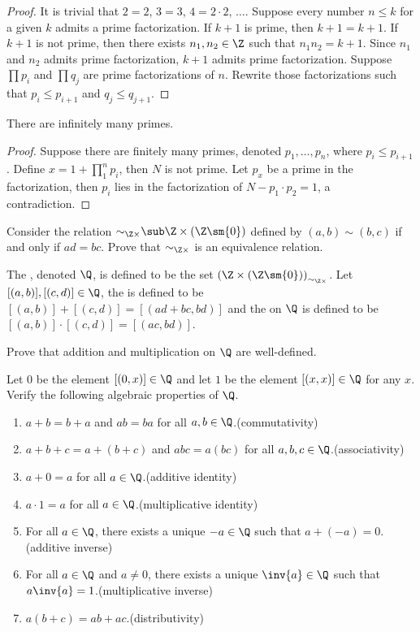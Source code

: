 \documentclass[10pt]{article}
\begin{document}
\begin{proof}
    It is trivial that $2=2$, $3=3$, $4=2\cdot 2$, $\dots$. Suppose every number $n\le k$ for a given $k$ admits a prime factorization. If $k+1$ is prime, then $k+1=k+1$. If $k+1$ is not prime, then there exists ${n}_{1},{n}_{2}\in\Z$ such that ${n}_{1}{n}_{2}=k+1$. Since ${n}_{1}$ and ${n}_{2}$ admits prime factorization, $k+1$ admits prime factorization. Suppose $\prod{p}_{i}$ and $\prod{q}_{j}$ are prime factorizations of $n$. Rewrite those factorizations such that ${p}_{i}\le{p}_{i+1}$ and ${q}_{j}\le{q}_{j+1}$. 
\end{proof}
\begin{theorem}
    There are infinitely many primes.
\end{theorem}
\begin{proof}
    Suppose there are finitely many primes, denoted ${p}_{1},\dots,{p}_{n}$, where ${p}_{i}\le{p}_{i+1}$. Define $x=1+{\prod}_{1}^{n}{p}_{i}$, then $N$ is not prime. Let ${p}_{x}$ be a prime in the factorization, then ${p}_{i}$ lies in the factorization of $N-{p}_{1}\cdot{p}_{2}=1$, a contradiction.
\end{proof}
\begin{problem}
    Consider the relation ${\sim}_{\Z\times}\sub\Z\times(\Z\sm\{0\})$ defined by $(a,b)\sim(b,c)$ if and only if $ad=bc$. Prove that ${\sim}_{\Z\times}$ is an equivalence relation.
\end{problem}
\begin{definition}
    The , denoted $\Q$, is defined to be the set ${(\Z\times(\Z\sm\{0\}))}_{{\sim}_{\Z\times}}$. Let $[(a,b)],[(c,d)]\in\Q$, the  is defined to be $[(a,b)]+[(c,d)]=[(ad+bc,bd)]$ and the  on $\Q$ is defined to be $[(a,b)]\cdot[(c,d)]=[(ac,bd)]$.
\end{definition}
\begin{problem}
    Prove that addition and multiplication on $\Q$ are well-defined.
\end{problem}
\begin{problem}
    Let $0$ be the element $[(0,x)]\in\Q$ and let $1$ be the element $[(x,x)]\in\Q$ for any $x$. Verify the following algebraic properties of $\Q$.
    \begin{enumerate}
        \item $a+b=b+a$ and $ab=ba$ for all $a,b\in\Q$.\hfill(commutativity)
        \item $a+b+c=a+(b+c)$ and $abc=a(bc)$ for all $a,b,c\in\Q$.\hfill(associativity)
        \item $a+0=a$ for all $a\in\Q$.\hfill(additive identity)
        \item $a\cdot 1=a$ for all $a\in\Q$.\hfill(multiplicative identity)
        \item For all $a\in\Q$, there exists a unique $-a\in\Q$ such that $a+(-a)=0$.\hfill(additive inverse)
        \item For all $a\in\Q$ and $a\ne 0$, there exists a unique $\inv{a}\in\Q$ such that $a\inv{a}=1$.\hfill(multiplicative inverse)
        \item $a(b+c)=ab+ac$.\hfill(distributivity) 
    \end{enumerate}
\end{problem}
\end{document}
